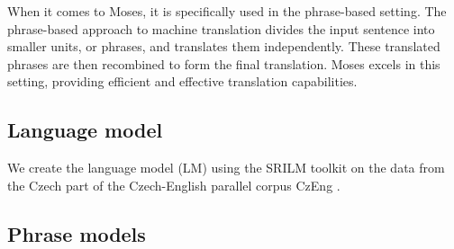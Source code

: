 When it comes to Moses, it is specifically used in the phrase-based setting. The phrase-based approach to machine translation divides the input sentence into smaller units, or phrases, and translates them independently. These translated phrases are then recombined to form the final translation. Moses excels in this setting, providing efficient and effective translation capabilities.


\subsection{Language model}
We create the language model (LM) using the SRILM toolkit \cite{srilm} on the 
data from the Czech part of the Czech-English parallel corpus CzEng \cite{czeng10:lrec2012}. 

\subsection{Phrase models}

